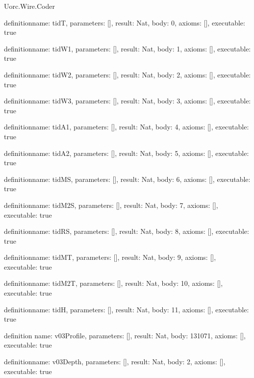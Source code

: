 \begin{lexlean}{Uorc.Wire.Coder}
\begin{semanticmodule}
definition{name: tidT, parameters: [], result: Nat, body: 0, axioms: [], executable: true}

definition{name: tidW1, parameters: [], result: Nat, body: 1, axioms: [], executable: true}

definition{name: tidW2, parameters: [], result: Nat, body: 2, axioms: [], executable: true}

definition{name: tidW3, parameters: [], result: Nat, body: 3, axioms: [], executable: true}

definition{name: tidA1, parameters: [], result: Nat, body: 4, axioms: [], executable: true}

definition{name: tidA2, parameters: [], result: Nat, body: 5, axioms: [], executable: true}

definition{name: tidMS, parameters: [], result: Nat, body: 6, axioms: [], executable: true}

definition{name: tidM2S, parameters: [], result: Nat, body: 7, axioms: [], executable: true}

definition{name: tidRS, parameters: [], result: Nat, body: 8, axioms: [], executable: true}

definition{name: tidMT, parameters: [], result: Nat, body: 9, axioms: [], executable: true}

definition{name: tidM2T, parameters: [], result: Nat, body: 10, axioms: [], executable: true}

definition{name: tidH, parameters: [], result: Nat, body: 11, axioms: [], executable: true}

definition{
  name: v03Profile,
  parameters: [],
  result: Nat,
  body: 131071,
  axioms: [],
  executable: true
}

definition{name: v03Depth, parameters: [], result: Nat, body: 2, axioms: [], executable: true}
\end{semanticmodule}
\end{lexlean}
